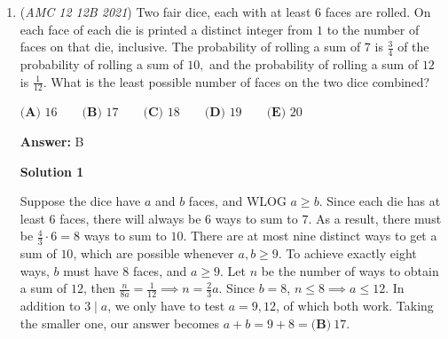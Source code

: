 \begin{enumerate}
Using $z\bar{z}=|z|^2$, we have\begin{align*}12z\bar{z} = 2(z + 2)(\bar{z} + 2) + (z^2 + 1)(\bar{z}^2 + 1) + 31 &\implies z^2\bar{z}^2 + z^2 + \bar{z}^2 + 1 + 2z\bar{z} + 4z + 4\bar{z} + 8 + 31 - 12z\bar{z} = 0 \\&\implies  z^2\bar{z}^2 - 10z\bar{z} + (z^2 + \bar{z}^2) + 4(z + \bar{z}) + 40 = 0\end{align*}
Let $p = z\bar{z}$ and $s = z + \bar{z}$. Then we get\begin{align*}p^2 - 10p + s^2 - 2p + 4s + 40 = 0 \implies p^2 - 12p + s^2 + 4s + 40 = 0\end{align*}
Completing the square, we get
 \[(p-6)^2 - 36 + (s+2)^2 - 4 + 40 = (p-6)^2 + (s+2)^2 = 0\]Therefore, $p = 6$ and $s = -2$. So, $z + \bar{z} = -2$ and $z\bar{z} = 6$. Plugging into $z + \frac{6}{z}$, we get
 \[z + \frac{6}{z} = z + \frac{6\bar{z}}{z\bar{z}} = z + \frac{6\bar{z}}{6} = z + \bar{z} = \boxed{\textbf{(A) }-2}\]

 (includes review of complex numbers)

 


 


 


	\item (\textit{AMC 12 12B 2021}) Two fair dice, each with at least $6$ faces are rolled. On each face of each die is printed a distinct integer from $1$ to the number of faces on that die, inclusive. The probability of rolling a sum of $7$ is $\frac34$ of the probability of rolling a sum of $10,$ and the probability of rolling a sum of $12$ is $\frac{1}{12}$. What is the least possible number of faces on the two dice combined?


 $\textbf{(A) }16 \qquad \textbf{(B) }17 \qquad \textbf{(C) }18\qquad \textbf{(D) }19 \qquad \textbf{(E) }20$

 \textbf{Answer: }B



\textbf{Solution 1}

Suppose the dice have $a$ and $b$ faces, and WLOG $a\geq{b}$. Since each die has at least $6$ faces, there will always be $6$ ways to sum to $7$. As a result, there must be $\frac{4}{3}\cdot6=8$ ways to sum to $10$. There are at most nine distinct ways to get a sum of $10$, which are possible whenever $a,b\geq{9}$. To achieve exactly eight ways, $b$ must have $8$ faces, and $a\geq9$. Let $n$ be the number of ways to obtain a sum of $12$, then $\frac{n}{8a}=\frac{1}{12}\implies n=\frac{2}{3}a$. Since $b=8$, $n\leq8\implies a\leq{12}$. In addition to $3\mid{a}$, we only have to test $a=9,12$, of which both work. Taking the smaller one, our answer becomes $a+b=9+8=\boxed{\textbf{(B)}\ 17}$.


\end{enumerate}
